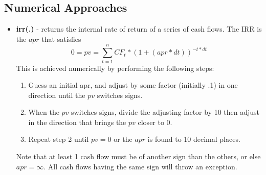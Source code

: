\documentclass[10pt]{article}
\begin{document}
\subsection{Numerical Approaches}
\begin{itemize}
\item \textbf{irr(.)} - returns the internal rate of return of a series of cash flows. The IRR is
    the $apr$ that satisfies\\
    \begin{equation}
        0 = pv = \sum_{t=1}^n CF_t * (1 + (apr*dt))^{-t*dt}
    \end{equation}
    This is achieved numerically by performing the following steps:
    \begin{enumerate}
    \item Guess an initial apr, and adjust by some factor (initially .1) in one direction 
            until the $pv$ switches signs.
    \item When the $pv$ switches signs, divide the adjusting factor by 10 then adjust in the direction
        that brings the $pv$ closer to 0.
    \item Repeat step 2 until $pv = 0$ or the $apr$ is found to 10 decimal places.
    \end{enumerate}
    Note that at least 1 cash flow must be of another sign than the others, or else
    $apr = \infty$. All cash flows having the same sign will throw an exception.
\end{itemize}
\end{document}
